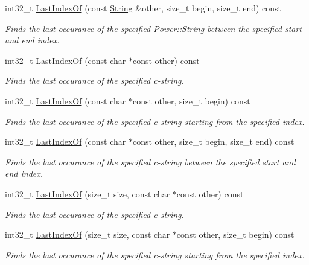 \begin{DoxyCompactItemize}
int32\+\_\+t \hyperlink{class_power_1_1_string_a2f950e28561d788a38d926448ba7260d}{Last\+Index\+Of} (const \hyperlink{class_power_1_1_string}{String} \&other, size\+\_\+t begin, size\+\_\+t end) const
\begin{DoxyCompactList}\small\item\em Finds the last occurance of the specified \hyperlink{class_power_1_1_string}{Power\+::\+String} between the specified start and end index. \end{DoxyCompactList}\item 
int32\+\_\+t \hyperlink{class_power_1_1_string_a50e8d0dfc670d7bff43d9b1f6f51624c}{Last\+Index\+Of} (const char $\ast$const other) const
\begin{DoxyCompactList}\small\item\em Finds the last occurance of the specified c-\/string. \end{DoxyCompactList}\item 
int32\+\_\+t \hyperlink{class_power_1_1_string_af029a026b7bd182e573809b826b2c35c}{Last\+Index\+Of} (const char $\ast$const other, size\+\_\+t begin) const
\begin{DoxyCompactList}\small\item\em Finds the last occurance of the specified c-\/string starting from the specified index. \end{DoxyCompactList}\item 
int32\+\_\+t \hyperlink{class_power_1_1_string_a85d80419046a52ab5a76f35826119d9b}{Last\+Index\+Of} (const char $\ast$const other, size\+\_\+t begin, size\+\_\+t end) const
\begin{DoxyCompactList}\small\item\em Finds the last occurance of the specified c-\/string between the specified start and end index. \end{DoxyCompactList}\item 
int32\+\_\+t \hyperlink{class_power_1_1_string_a99e11257d4759d99cec53f8ef4db0145}{Last\+Index\+Of} (size\+\_\+t size, const char $\ast$const other) const
\begin{DoxyCompactList}\small\item\em Finds the last occurance of the specified c-\/string. \end{DoxyCompactList}\item 
int32\+\_\+t \hyperlink{class_power_1_1_string_a7eb0972605584abe381437b13a165d39}{Last\+Index\+Of} (size\+\_\+t size, const char $\ast$const other, size\+\_\+t begin) const
\begin{DoxyCompactList}\small\item\em Finds the last occurance of the specified c-\/string starting from the specified index. \end{DoxyCompactList}\item 

\end{DoxyCompactItemize}
